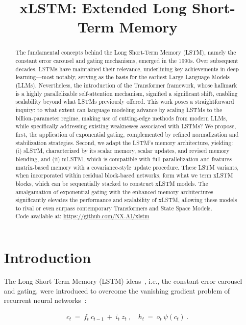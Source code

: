 \title{xLSTM: Extended Long Short-Term Memory}

\begin{abstract}
The fundamental concepts behind the Long Short-Term Memory (LSTM), namely the constant error carousel and gating mechanisms, emerged in the 1990s. Over subsequent decades, LSTMs have maintained their relevance, underlining key achievements in deep learning—most notably, serving as the basis for the earliest Large Language Models (LLMs). Nevertheless, the introduction of the Transformer framework, whose hallmark is a highly parallelizable self-attention mechanism, signified a significant shift, enabling scalability beyond what LSTMs previously offered. This work poses a straightforward inquiry: to what extent can language modeling advance by scaling LSTMs to the billion-parameter regime, making use of cutting-edge methods from modern LLMs, while specifically addressing existing weaknesses associated with LSTMs? We propose, first, the application of exponential gating, complemented by refined normalization and stabilization strategies. Second, we adapt the LSTM's memory architecture, yielding: (i) sLSTM, characterized by its scalar memory, scalar updates, and revised memory blending, and (ii) mLSTM, which is compatible with full parallelization and features matrix-based memory with a covariance-style update procedure. These LSTM variants, when incorporated within residual block-based networks, form what we term xLSTM blocks, which can be sequentially stacked to construct xLSTM models. The amalgamation of exponential gating with the enhanced memory architectures significantly elevates the performance and scalability of xLSTM, allowing these models to rival or even surpass contemporary Transformers and State Space Models.\\
Code available at: \url{https://github.com/NX-AI/xlstm}
\end{abstract}

\section{Introduction}
\label{sec:intro}

The Long Short-Term Memory (LSTM) ideas~\citep{Hochreiter:91,Hochreiter:97nips,Hochreiter:97}, i.e., the constant error carousel and gating, were introduced to overcome the vanishing gradient problem of recurrent neural networks~\citep{Hochreiter:91,Hochreiter:00book}:

\begin{align}
\label{eq:lstm_idea}
  c_t \ = \ f_t \ c_{t-1} \ + \ 
          i_t \  z_t \ , \quad  
          h_t \ = \ o_t \ \psi({c_t}) \ . 
\end{align}

